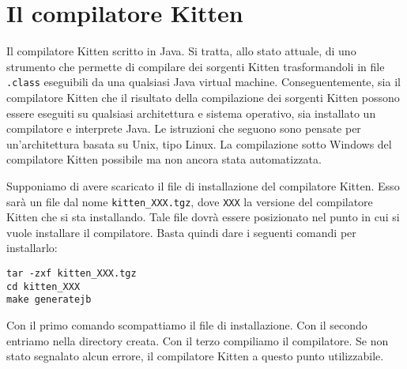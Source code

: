 %
\section{Il compilatore Kitten}\label{sec:kitten_compiler}
%
Il compilatore Kitten \e scritto in Java. Si tratta, allo stato attuale, di
uno strumento che permette di compilare dei sorgenti Kitten trasformandoli
in file \texttt{.class} eseguibili da una qualsiasi Java virtual machine.
Conseguentemente, sia il compilatore Kitten che il risultato della
compilazione dei sorgenti Kitten possono essere eseguiti su qualsiasi
architettura e sistema operativo, \purche sia installato un compilatore
e interprete Java. Le istruzioni che seguono sono pensate per un'architettura
basata su Unix, tipo Linux. La compilazione sotto Windows del compilatore
Kitten \e possibile ma \e non ancora stata automatizzata.

Supponiamo di avere scaricato il file di installazione del compilatore
Kitten. Esso sar\`a un file dal nome \texttt{kitten\_XXX.tgz}, dove
\texttt{XXX} \e la versione del compilatore Kitten che si sta installando.
Tale file dovr\`a essere posizionato nel punto in cui si vuole installare
il compilatore.
Basta quindi dare i seguenti comandi per installarlo:
%
\begin{verbatim}
tar -zxf kitten_XXX.tgz
cd kitten_XXX
make generatejb
\end{verbatim}
%
Con il primo comando scompattiamo il file di installazione. Con il secondo
entriamo nella directory \cosi creata. Con il terzo compiliamo il
compilatore.
Se non \e stato segnalato alcun errore, il compilatore Kitten \e a questo
punto utilizzabile.
%
